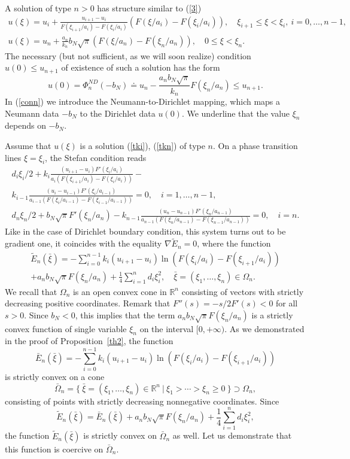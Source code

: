 \documentclass[10pt,a4paper]{amsart}
\numberwithin{equation}{section}
\newcommand{\R}{{\mathbb R}}
\begin{document}
A solution of type $n>0$ has structure similar to (\ref{3})
\begin{align}\label{tki}
u(\xi)=u_i+\frac{u_{i+1}-u_i}{F(\xi_{i+1}/a_i)-F(\xi_i/a_i)}(F(\xi/a_i)-F(\xi_i/a_i)), \quad
\xi_{i+1}\le\xi<\xi_i, \ i=0,\ldots,n-1, \\
\label{tkn}
u(\xi)=u_n+\frac{a_n}{k_n}b_N\sqrt{\pi}(F(\xi/a_n)-F(\xi_n/a_n)), \quad 0\le\xi<\xi_n.
\end{align}
The necessary (but not sufficient, as we will soon realize) condition $u(0)\le u_{n+1}$ of existence of such a solution has the form
\begin{equation}\label{conn}
u(0)=\Phi^{ND}_n(-b_N)\doteq u_n-\frac{a_nb_N\sqrt{\pi}}{k_n} F(\xi_n/a_n)\le u_{n+1}.
\end{equation}
In (\ref{conn}) we introduce the Neumann-to-Dirichlet mapping, which maps a Neumann data $-b_N$ to the Dirichlet data $u(0)$. We underline that the value $\xi_n$ depends on $-b_N$.

Assume that $u(\xi)$ is a solution (\ref{tki}), (\ref{tkn}) of type $n$.
On a phase transition lines $\xi=\xi_i$, the Stefan condition reads
\begin{align}\label{sysi}
d_i\xi_i/2+k_i\frac{(u_{i+1}-u_i)F'(\xi_i/a_i)}{a_i(F(\xi_{i+1}/a_i)-F(\xi_i/a_i))}- \nonumber\\
k_{i-1}\frac{(u_i-u_{i-1})F'(\xi_i/a_{i-1})}{a_{i-1}(F(\xi_i/a_{i-1})-F(\xi_{i-1}/a_{i-1}))}=0, \quad i=1,\ldots,n-1, \\
\label{sysn}
d_n\xi_n/2+b_N\sqrt{\pi} F'(\xi_n/a_n)- k_{n-1}\frac{(u_n-u_{n-1})F'(\xi_n/a_{n-1})}{a_{n-1}(F(\xi_n/a_{n-1})-F(\xi_{n-1}/a_{n-1}))}=0, \quad i=n.
\end{align}
Like in the case of Dirichlet boundary condition, this system turns out to be gradient one, it coincides with the equality $\nabla\tilde E_n=0$, where the function
\begin{align}\label{E}
\tilde E_n(\bar\xi)=-\sum_{i=0}^{n-1}k_i(u_{i+1}-u_i)\ln (F(\xi_i/a_i)-F(\xi_{i+1}/a_i))\nonumber\\
+a_nb_N\sqrt{\pi}F(\xi_n/a_n)+\frac{1}{4}\sum_{i=1}^n d_i\xi_i^2, \quad \bar\xi=(\xi_1,\ldots,\xi_n)\in\Omega_n.
\end{align}
We recall that $\Omega_n$ is an open convex cone in $\R^n$ consisting of vectors with strictly decreasing positive coordinates.
Remark that $F''(s)=-s/2F'(s)<0$ for all $s>0$. Since $b_N<0$, this implies that the term $a_nb_N\sqrt{\pi}F(\xi_n/a_n)$ is a strictly convex function of single variable $\xi_n$ on the interval $[0,+\infty)$. As we demonstrated in the proof of Proposition~\ref{th2}, the function
\[
\bar E_n(\bar\xi)=-\sum_{i=0}^{n-1}k_i(u_{i+1}-u_i)\ln (F(\xi_i/a_i)-F(\xi_{i+1}/a_i))
\]
is strictly convex on a cone
\[\bar\Omega_n=\{ \ \bar\xi=(\xi_1,\ldots,\xi_n)\in\R^n \ | \ \xi_1>\cdots>\xi_n\ge 0 \ \}\supset\Omega_n,\]
consisting of points with strictly decreasing nonnegative coordinates. Since
\[\tilde E_n(\bar\xi)=\bar E_n(\bar\xi)+a_nb_N\sqrt{\pi}F(\xi_n/a_n)+\frac{1}{4}\sum_{i=1}^n d_i\xi_i^2,\] the function $\tilde E_n(\bar\xi)$ is strictly convex on $\bar\Omega_n$ as well.
Let us demonstrate that this function is coercive on $\bar\Omega_n$.
\end{document}

